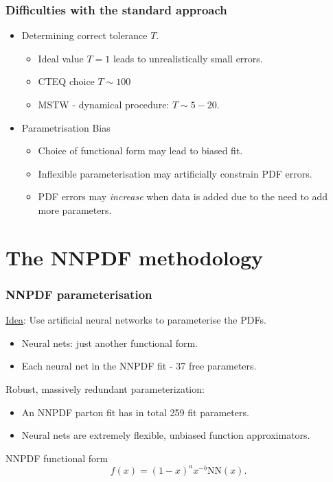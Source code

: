 \documentclass[10pt]{beamer}
\newcommand{\be}{\begin{equation*}}
\newcommand{\ee}{\end{equation*}}
\newcommand{\vso}{\vskip15pt}
\newcommand{\vst}{\vskip30pt}
\begin{document}
\begin{frame}
\frametitle{Difficulties with the standard approach}
\begin{itemize}
\item<1-> Determining correct tolerance $T$. 
\begin{itemize}
\item<1-> Ideal value $T=1$ leads to unrealistically small errors.
\item<1-> CTEQ choice $T \sim 100$
\item<1-> MSTW - dynamical procedure: $T \sim 5-20$.
\end{itemize}
\vst
\item<1->Parametrisation Bias
\begin{itemize}
\item<1-> Choice of functional form may lead to biased fit.
\item<1-> Inflexible parameterisation may artificially constrain PDF errors.
\item<1-> PDF errors may \emph{increase} when data is added due to the need to add more parameters.  
\end{itemize}

\end{itemize}
\vst	
	

\end{frame}


\section{The NNPDF methodology}

\begin{frame}
\frametitle{NNPDF parameterisation}
\underline{Idea}: Use artificial neural networks to parameterise the PDFs.
\begin{itemize}
\item<1-> Neural nets: just another functional form.
\item<1-> Each neural net in the NNPDF fit - 37 free parameters.
\end{itemize}
\vso
Robust, massively redundant parameterization:
\begin{itemize}
\item<1-> An NNPDF parton fit has in total 259 fit parameters.
\item<1-> Neural nets are extremely flexible, unbiased function approximators.
\end{itemize}
\vso

\hfill\begin{minipage}{6cm}
\begin{block}
{ \centering NNPDF functional form}
\be f(x)=(1-x)^{a}x^{-b} \mathrm{NN}(x). \ee
\end{block}
\end{minipage}\hfill{}


\end{frame}
\end{document}
